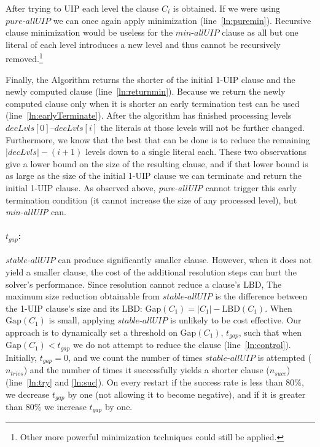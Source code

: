 \documentclass[runningheads]{llncs}
\newcommand{\LBD}{\text{LBD}\xspace}
\newcommand{\gap}{\text{Gap}}
\newcommand{\tgap}{t_{\mathit{gap}}}
\newcommand{\ntries}{n_{\mathit{tries}}}
\newcommand{\nsuc}{n_{\mathit{succ}}}
\newcommand{\allUip}{\textit{stable-allUIP}}
\newcommand{\allUipPure}{\textit{pure-allUIP}\xspace}
\newcommand{\allUipMin}{\textit{min-allUIP}\xspace}
\newcommand{\dlevels}{\ensuremath{\mathit{decLvls}}}
\begin{document}
After trying to UIP each level the clause $C_i$ is obtained. If we
were using $\allUipPure$ we can once again apply minimization
(line~\ref{ln:puremin}). Recursive clause minimization
\cite{DBLP:conf/sat/SorenssonB09} would be useless for the $\allUipMin$
clause as all but one literal of each level introduces a new level and
thus cannot be recursively removed.\footnote{Other more powerful
  minimization techniques could still be applied.} 

Finally, the Algorithm returns the shorter of the initial 1-UIP clause
and the newly computed clause (line~\ref{ln:returnmin}). Because we
return the newly computed clause only when it is shorter an early
termination test can be used (line~\ref{ln:earlyTerminate}). After the
algorithm has finished processing levels $\dlevels[0]$--$\dlevels[i]$
the literals at those levels will not be further changed. Furthermore,
we know that the best that can be done is to reduce the remaining
$|\dlevels| - (i+1)$ levels down to a single literal each. These two
observations give a lower bound on the size of the resulting clause,
and if that lower bound is as large as the size of the initial 1-UIP
clause we can terminate and return the initial 1-UIP clause. As
observed above, \allUipPure cannot trigger this early termination
condition (it cannot increase the size of any processed level), but
\allUipMin can.

\paragraph{$\tgap$:}
$\allUip$ can produce significantly smaller clause. However, when it
does not yield a smaller clause, the cost of the additional resolution
steps can hurt the solver's performance. Since resolution cannot
reduce a clause's $\LBD$, The maximum size reduction obtainable from
$\allUip$ is the difference between the 1-UIP clause's size and its
$\LBD$: $\gap(C_1) = |C_1| - \LBD(C_1)$. When $\gap(C_1)$ is small,
applying $\allUip$ is unlikely to be cost effective. Our approach is
to dynamically set a threshold on $\gap(C_1)$, $\tgap$, such that when
$\gap(C_1) < \tgap$ we do not attempt to reduce the clause
(line~\ref{ln:control}). Initially, $\tgap = 0$, and we count the
number of times $\allUip$ is attempted ($\ntries$) and the number of
times it successfully yields a shorter clause ($\nsuc$)
(line~\ref{ln:try} and \ref{ln:suc}). On every restart if the success
rate is less than 80\%, we decrease $\tgap$ by one (not allowing it to
become negative), and if it is greater than 80\% we increase $\tgap$
by one.
\end{document}
